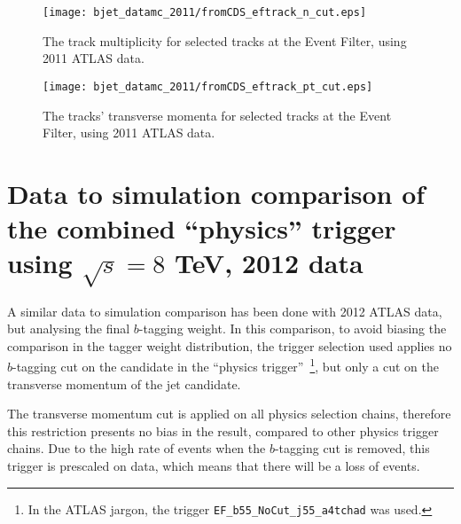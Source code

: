 \begin{figure}[H]
\centering
\texttt{[image: bjet\_datamc\_2011/fromCDS\_eftrack\_n\_cut.eps]}
\caption{The track multiplicity for selected tracks at the Event Filter, using 2011 ATLAS data.}
\label{fig:fromCDS_eftrack_n_cut}
\end{figure}

\begin{figure}[H]
\centering
\texttt{[image: bjet\_datamc\_2011/fromCDS\_eftrack\_pt\_cut.eps]}
\caption{The tracks' transverse momenta for selected tracks at the Event Filter, using 2011 ATLAS data.}
\label{fig:fromCDS_eftrack_pt_cut}
\end{figure}


%

\section{Data to simulation comparison of the \bjet combined ``physics'' trigger using $\sqrt{s} = 8$ TeV, 2012 data}
\label{sec:datamc_physics}

A similar data to simulation comparison has been done with 2012 ATLAS data, but analysing the final $b$-tagging weight.
In this comparison, to avoid biasing the comparison in the tagger weight distribution, the trigger selection used applies no $b$-tagging cut
on the \bjet candidate in the ``physics trigger''~\footnote{In the ATLAS jargon, the trigger \texttt{EF\_b55\_NoCut\_j55\_a4tchad} was used.},
but only a cut on the transverse momentum of the jet candidate.

The transverse momentum cut is applied
on all \bjet physics selection chains, therefore this restriction presents no bias in the result, compared to other \bjet physics trigger chains.
Due to the high rate of events when the $b$-tagging cut is removed, this trigger is prescaled on data, which means that there will be a loss
of events. 


